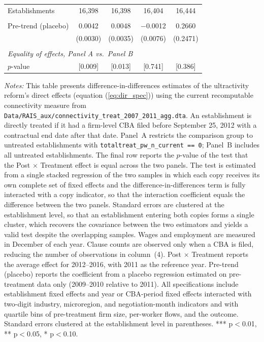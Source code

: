 \documentclass[11pt]{article}
\begin{document}
\begin{table}[H]
\begin{tabular}{lcccc}
Establishments & 16{,}398 & 16{,}398 & 16{,}404 & 16{,}444\\
 &  &  &  & \\
Pre-trend (placebo) & 0.0042 & 0.0048 & $-$0.0012 & 0.2660\\
 & (0.0030) & (0.0035) & (0.0076) & (0.2471)\\
 &  &  &  & \\
\midrule
\multicolumn{5}{l}{\textit{Equality of effects, Panel A vs.\ Panel B}}\\
$p$-value & [0.009] & [0.013] & [0.741] & [0.386]\\
\bottomrule\bottomrule
\end{tabular}
\begin{minipage}{\linewidth}
    \scriptsize\vspace{4pt}
     \textit{Notes:} This table presents difference-in-differences estimates of the ultractivity reform's direct effects (equation (\ref{eq:dir_spec})) using the current recomputable connectivity measure from \texttt{Data/RAIS\_aux/connectivity\_treat\_2007\_2011\_agg.dta}. An establishment is directly treated if it had a firm-level CBA filed before September 25, 2012 with a contractual end date after that date. Panel~A restricts the comparison group to untreated establishments with \texttt{totaltreat\_pw\_n\_current == 0}; Panel~B includes all untreated establishments. The final row reports the $p$-value of the test that the Post $\times$ Treatment effect is equal across the two panels. The test is estimated from a single stacked regression of the two samples in which each copy receives its own complete set of fixed effects and the difference-in-differences term is fully interacted with a copy indicator, so that the interaction coefficient equals the difference between the two panels. Standard errors are clustered at the establishment level, so that an establishment entering both copies forms a single cluster, which recovers the covariance between the two estimators and yields a valid test despite the overlapping samples. Wages and employment are measured in December of each year. Clause counts are observed only when a CBA is filed, reducing the number of observations in column~(4). Post $\times$ Treatment reports the average effect for 2012--2016, with 2011 as the reference year. Pre-trend (placebo) reports the coefficient from a placebo regression estimated on pre-treatment data only (2009--2010 relative to 2011). All specifications include establishment fixed effects and year or CBA-period fixed effects interacted with two-digit industry, microregion, and negotiation-month indicators and with quartile bins of pre-treatment firm size, per-worker flows, and the outcome. Standard errors clustered at the establishment level in parentheses. *** p$<$0.01, ** p$<$0.05, * p$<$0.10.
\end{minipage}
\end{table}
\end{document}
